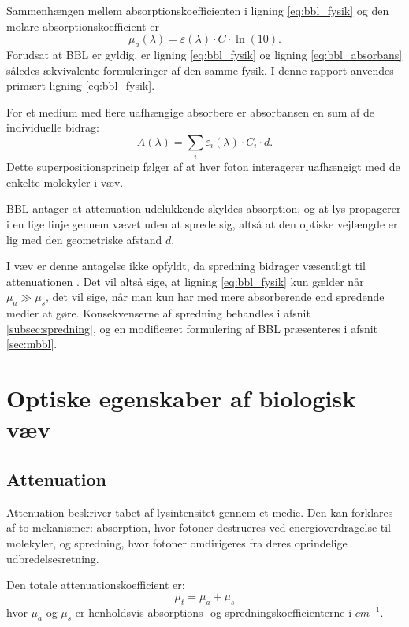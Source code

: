 Sammenhængen mellem absorptionskoefficienten i ligning \ref{eq:bbl_fysik} og den molare absorptionskoefficient er
\begin{equation}
    \mu_a(\lambda) = \varepsilon(\lambda) \cdot C \cdot \ln(10).
    \label{eq:mu_epsilon}
\end{equation}
Forudsat at BBL er gyldig, er ligning \ref{eq:bbl_fysik} og ligning \ref{eq:bbl_absorbans} således ækvivalente formuleringer af den samme fysik. I denne rapport anvendes primært ligning \ref{eq:bbl_fysik}.

For et medium med flere uafhængige absorbere er absorbansen en sum af de individuelle bidrag:
\begin{equation}
    A(\lambda) = \sum_i \varepsilon_i(\lambda) \cdot C_i \cdot d.
    \label{eq:bbl_multi}
\end{equation}
Dette superpositionsprincip følger af at hver foton interagerer uafhængigt med de enkelte molekyler i væv.

BBL antager at attenuation udelukkende skyldes absorption, og at lys propagerer i en lige linje gennem vævet uden at sprede sig, altså at den optiske vejlængde er lig med den geometriske afstand $d$. 

I væv er denne antagelse ikke opfyldt, da spredning bidrager væsentligt til attenuationen \cite{Tuchin2015}. Det vil altså sige, at ligning \ref{eq:bbl_fysik} kun gælder når $\mu_a \gg \mu_s$, det vil sige, når man kun har med mere absorberende end spredende medier at gøre. Konsekvenserne af spredning behandles i afsnit \ref{subsec:spredning}, og en modificeret formulering af BBL præsenteres i afsnit \ref{sec:mbbl}.
\section{Optiske egenskaber af biologisk væv}
\label{sec:optik_vaev}

\subsection{Attenuation}
Attenuation beskriver tabet af lysintensitet gennem et medie. Den kan forklares af to mekanismer: absorption, hvor fotoner destrueres ved energioverdragelse til molekyler, og spredning, hvor fotoner omdirigeres fra deres oprindelige udbredelsesretning. 

Den totale attenuationskoefficient er:
\begin{equation}
    \mu_t = \mu_a + \mu_s
    \label{eq:mu_total}
\end{equation}
hvor $\mu_a$ og $\mu_s$ er henholdsvis absorptions- og 
spredningskoefficienterne i $\si{cm^{-1}}$.

